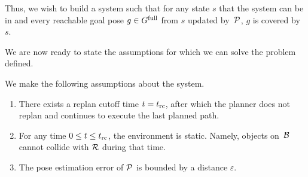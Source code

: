 \documentclass[conference]{IEEEtran}
\begin{document}
Thus, we wish to build a system such that 
for any state $s$ that the system can be in 
and every reachable goal pose $g \in G^{\textrm{full}}$ from $s$ updated by~$\mathcal{P}$,
$g$ is covered by $s$.


We are now ready to state the assumptions for which we can solve the problem defined.

We make the following assumptions about the system.
\begin{enumerate}[label={\textbf{A\arabic*}},leftmargin=0.75cm]
    

    \item \label{assum:4} There exists a replan cutoff time $t=t_{\textrm{rc}}$, after which the planner does not replan and continues to execute the last planned path.

    \item \label{assum:5} For any time $0 \leq t \leq t_{\textrm{rc}}$, the environment is static. Namely, objects on~$\mathcal{B}$ cannot collide with $\mathcal{R}$ during that time.

    \item \label{assum:3} The pose estimation error of $\mathcal{P}$ is bounded by a distance $\varepsilon$.
        
    

\end{enumerate}
\end{document}
